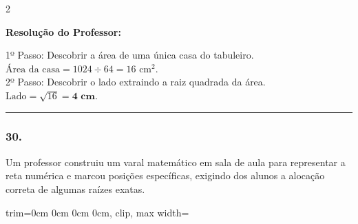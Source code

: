 \begin{multicols*}{2}
\ifgabarito
    \begin{tcolorbox}[colback=CorTitUm!5, colframe=CorTitUm, boxrule=1pt, arc=4pt, left=6pt, right=6pt, top=6pt, bottom=6pt]
    \small\textbf{\textcolor{CorTitUm}{Resolução do Professor:}}\par\vspace{0.1cm}
    \color{CinzaEscuro}
    1º Passo: Descobrir a área de uma única casa do tabuleiro.\\
    $ \text{Área da casa} = 1024 \div 64 = 16 \text{ cm}^{2} $.\\
    2º Passo: Descobrir o lado extraindo a raiz quadrada da área.\\
    $ \text{Lado} = \sqrt{16} = \textbf{4 cm} $.
    \end{tcolorbox}
\fi

\par\vspace{\espacoQuestao}

\noindent\textcolor{CorLinha}{\rule{\linewidth}{0.5pt}} 
\par\vspace{\espacoPreQuestao}
\subsubsection*{30.} Um professor construiu um varal matemático em sala de aula para representar a reta numérica e marcou posições específicas, exigindo dos alunos a alocação correta de algumas raízes exatas.
\begin{center}
\begin{adjustbox}{trim=0cm 0cm 0cm 0cm, clip, max width=\larguraTikz}
\end{adjustbox}
\end{center}
\end{multicols*}

